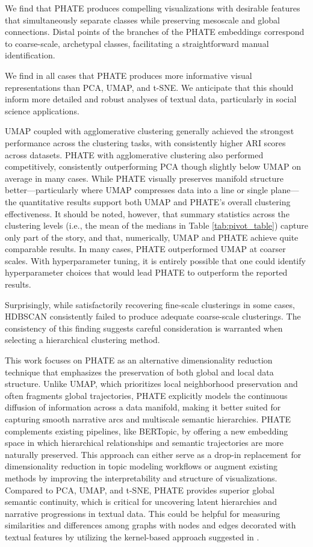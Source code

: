 We find that PHATE produces compelling visualizations with desirable features that simultaneously separate classes while preserving mesoscale and global connections. Distal points of the branches of the PHATE embeddings correspond to coarse-scale, archetypal classes, facilitating a straightforward manual identification. 

We find in all cases that PHATE produces more informative visual representations than PCA, UMAP, and t-SNE. We anticipate that this should inform more detailed and robust analyses of textual data, particularly in social science applications.

UMAP coupled with agglomerative clustering generally achieved the strongest performance across the clustering tasks, with consistently higher ARI scores across datasets. PHATE with agglomerative clustering also performed competitively, consistently outperforming PCA though slightly below UMAP on average in many cases. While PHATE visually preserves manifold structure better—particularly where UMAP compresses data into a line or single plane—the quantitative results support both UMAP and PHATE’s overall clustering effectiveness. It should be noted, however, that summary statistics across the clustering levels (i.e., the mean of the medians in Table \ref{tab:pivot_table}) capture only part of the story, and that, numerically, UMAP and PHATE achieve quite comparable results. In many cases, PHATE outperformed UMAP at coarser scales. With hyperparameter tuning, it is entirely possible that one could identify hyperparameter choices that would lead PHATE to outperform the reported results. 

Surprisingly, while satisfactorily recovering fine-scale clusterings in some cases, HDBSCAN consistently failed to produce adequate coarse-scale clusterings. The consistency of this finding suggests careful consideration is warranted when selecting a hierarchical clustering method.

This work focuses on PHATE as an alternative dimensionality reduction technique that emphasizes the preservation of both global and local data structure. Unlike UMAP, which prioritizes local neighborhood preservation and often fragments global trajectories, PHATE explicitly models the continuous diffusion of information across a data manifold, making it better suited for capturing smooth narrative arcs and multiscale semantic hierarchies. PHATE complements existing pipelines, like BERTopic, by offering a new embedding space in which hierarchical relationships and semantic trajectories are more naturally preserved. This approach can either serve as a drop-in replacement for dimensionality reduction in topic modeling workflows or augment existing methods by improving the interpretability and structure of visualizations. Compared to PCA, UMAP, and t-SNE, PHATE provides superior global semantic continuity, which is critical for uncovering latent hierarchies and narrative progressions in textual data. This could be helpful for measuring similarities and differences among graphs with nodes and edges decorated with textual features by utilizing the kernel-based approach suggested in \citet{berijanian2024soft}.


